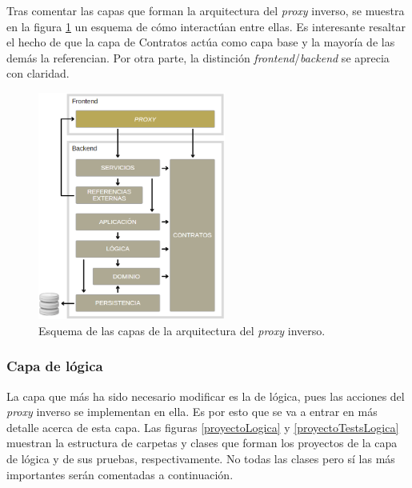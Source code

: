\documentclass[11pt,spanish,listoffigures]{tfgetsinf}
\begin{document}
Tras comentar las capas que forman la arquitectura del \emph{proxy} inverso, se muestra en la figura \ref{arquitectura} un esquema de cómo interactúan entre ellas. Es interesante resaltar el hecho de que la capa de Contratos actúa como capa base y la mayoría de las demás la referencian. Por otra parte, la distinción \emph{frontend}/\emph{backend} se aprecia con claridad.

\begin{figure}[ht]
\centering
\includegraphics[width=0.55\textwidth]{imagenes/arquitectura}
\caption{Esquema de las capas de la arquitectura del \emph{proxy} inverso.}
	\label{arquitectura}
\end{figure}


			\subsubsection{Capa de lógica}

La capa que más ha sido necesario modificar es la de lógica, pues las acciones del \emph{proxy} inverso se implementan en ella. Es por esto que se va a entrar en más detalle acerca de esta capa. Las figuras \ref{proyectoLogica} y \ref{proyectoTestsLogica} muestran la estructura de carpetas y clases que forman los proyectos de la capa de lógica y de sus pruebas, respectivamente. No todas las clases pero sí las más importantes serán comentadas a continuación.
\end{document}
